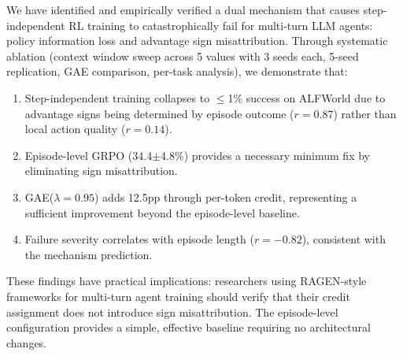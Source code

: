 \documentclass[11pt]{article}
\begin{document}
We have identified and empirically verified a dual mechanism that causes step-independent RL training to catastrophically fail for multi-turn LLM agents: policy information loss and advantage sign misattribution. Through systematic ablation (context window sweep across 5 values with 3 seeds each, 5-seed replication, GAE comparison, per-task analysis), we demonstrate that:

\begin{enumerate}
    \item Step-independent training collapses to $\leq$1\% success on ALFWorld due to advantage signs being determined by episode outcome ($r=0.87$) rather than local action quality ($r=0.14$).
    \item Episode-level GRPO (34.4$\pm$4.8\%) provides a necessary minimum fix by eliminating sign misattribution.
    \item GAE($\lambda=0.95$) adds 12.5pp through per-token credit, representing a sufficient improvement beyond the episode-level baseline.
    \item Failure severity correlates with episode length ($r=-0.82$), consistent with the mechanism prediction.
\end{enumerate}

These findings have practical implications: researchers using RAGEN-style frameworks for multi-turn agent training should verify that their credit assignment does not introduce sign misattribution. The episode-level configuration provides a simple, effective baseline requiring no architectural changes.
\end{document}
